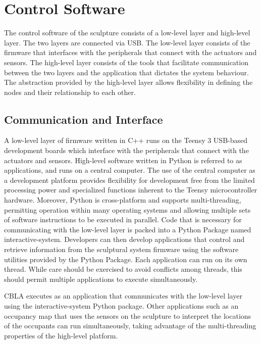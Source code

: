\FloatBarrier
\section{Control Software}

The control software of the sculpture consists of a low-level layer and high-level layer. The two layers are connected via USB. The low-level layer consists of the firmware that interfaces with the peripherals that connect with the actuators and sensors. The high-level layer consists of the tools that facilitate communication between the two layers and the application that dictates the system behaviour. The abstraction provided by the high-level layer allows flexibility in defining the nodes and their relationship to each other. 

\subsection{Communication and Interface}

A low-level layer of firmware written in C++ runs on the Teensy 3 USB-based development boards which interface with the peripherals that connect with the actuators and sensors.  High-level software written in Python is referred to as applications, and runs on a central computer. The use of the central computer as a development platform provides flexibility for development free from the limited processing power and specialized functions inherent to the Teensy microcontroller hardware. Moreover, Python is cross-platform and supports multi-threading, permitting operation within many operating systems and allowing multiple sets of software instructions to be executed in parallel. Code that is necessary for communicating with the low-level layer is packed into a Python Package named interactive-system. Developers can then develop applications that control and retrieve information from the sculptural system firmware using the software utilities provided by the Python Package. Each application can run on its own thread. While care should be exercised to avoid conflicts among threads, this should permit multiple applications to execute simultaneously.	

CBLA executes as an application that communicates with the low-level layer using the interactive-system Python package. Other applications such as an occupancy map that uses the sensors on the sculpture to interpret the locations of the occupants can run simultaneously, taking advantage of the multi-threading properties of the high-level platform.

